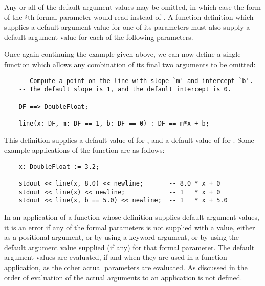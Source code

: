 Any or all of the default argument values may be omitted, in which case the
form of the $i\/$th formal parameter would read  instead of
.  A function definition which supplies a default argument
value for one of its parameters must also supply a default argument
value for each of the following parameters. 

Once again continuing the example given above, we can now define a single
function which allows any combination of its final two arguments to be omitted:

\begin{small}
\begin{verbatim}
    -- Compute a point on the line with slope `m' and intercept `b'.
    -- The default slope is 1, and the default intercept is 0.

    DF ==> DoubleFloat;

    line(x: DF, m: DF == 1, b: DF == 0) : DF == m*x + b;
\end{verbatim}
\end{small}

This definition supplies a default value of  for ,
and a default value of  for .  Some example
applications of the function  are as follows:

\begin{small}
\begin{verbatim}
    x: DoubleFloat := 3.2;

    stdout << line(x, 8.0) << newline;       -- 8.0 * x + 0
    stdout << line(x) << newline;            -- 1   * x + 0
    stdout << line(x, b == 5.0) << newline;  -- 1   * x + 5.0
\end{verbatim}
\end{small}

In an application of a function whose definition supplies default
argument values, it is an error if any of the formal parameters is not
supplied with a value, either as a positional argument, or by using a
keyword argument, or by using the default argument value supplied (if
any) for that formal parameter.  The default argument values are
evaluated, if and when they are used in a function application, as the
other actual parameters are evaluated.  As discussed in
 the order of evaluation of the actual
arguments to an application is not defined.


